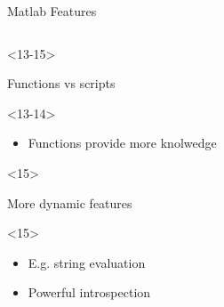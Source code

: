 \begin{frame}[fragile]{Matlab Features}
\begin{columns}
\begin{column}[T]{5cm}
\begin{itemize}
        \begin{onlyenv}<13-15>
        \item Functions vs scripts
          \begin{onlyenv}<13-14>
            \begin{itemize}
            \item Functions provide more knolwedge
            \end{itemize}         
          \end{onlyenv}
        \end{onlyenv}

        \begin{onlyenv}<15>
        \item More dynamic features
          \begin{onlyenv}<15>
            \begin{itemize}
            \item E.g. string evaluation
            \item Powerful introspection
            \end{itemize}         
          \end{onlyenv}
        \end{onlyenv}


      \end{itemize}
    \end{column}
  \end{columns}



\end{frame}





